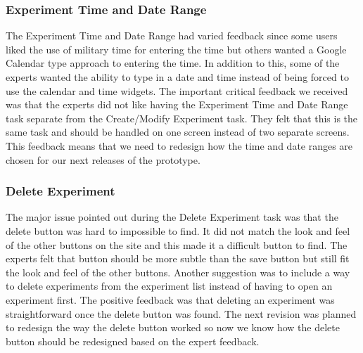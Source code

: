 \subsubsection{Experiment Time and Date Range}
The Experiment Time and Date Range had varied feedback since some users liked the use of military time for entering the time but others wanted a Google Calendar type approach to entering the time. In addition to this, some of the experts wanted the ability to type in a date and time instead of being forced to use the calendar and time widgets. The important critical feedback we received was that the experts did not like having the Experiment Time and Date Range task separate from the Create/Modify Experiment task. They felt that this is the same task and should be handled on one screen instead of two separate screens. This feedback means that we need to redesign how the time and date ranges are chosen for our next releases of the prototype.

\subsubsection{Delete Experiment}
The major issue pointed out during the Delete Experiment task was that the delete button was hard to impossible to find. It did not match the look and feel of the other buttons on the site and this made it a difficult button to find. The experts felt that button should be more subtle than the save button but still fit the look and feel of the other buttons. Another suggestion was to include a way to delete experiments from the experiment list instead of having to open an experiment first. The positive feedback was that deleting an experiment was straightforward once the delete button was found. The next revision was planned to redesign the way the delete button worked so now we know how the delete button should be redesigned based on the expert feedback.